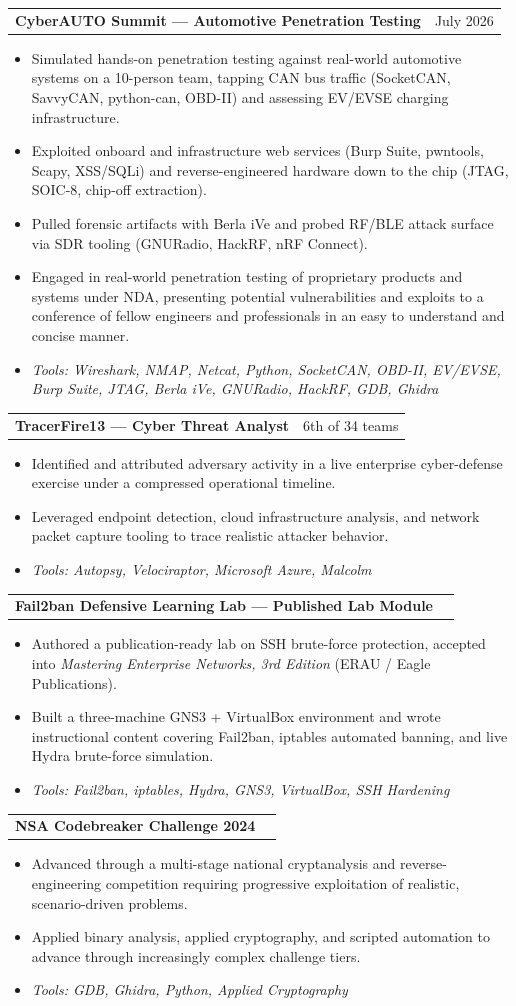 \documentclass[letterpaper,11pt]{article}
\makeatletter
\newcommand{\resumeItem}[1]{
  \item\small{
    {#1 \vspace{-2pt}}
  }
}
\newcommand{\resumeProjectHeading}[2]{
    \item
    \begin{tabular*}{0.97\textwidth}{l@{\extracolsep{\fill}}r}
      \small#1 & #2 \\
    \end{tabular*}\vspace{-7pt}
}
\newcommand{\resumeItemListStart}{\begin{itemize}}
\newcommand{\resumeItemListEnd}{\end{itemize}\vspace{-5pt}}
\makeatother
\begin{document}
      \resumeProjectHeading
          {\textbf{CyberAUTO Summit --- Automotive Penetration Testing}}{July 2026}
          \resumeItemListStart
            \resumeItem{Simulated hands-on penetration testing against real-world automotive systems on a 10-person team, tapping CAN bus traffic (SocketCAN, SavvyCAN, python-can, OBD-II) and assessing EV/EVSE charging infrastructure.}
            \resumeItem{Exploited onboard and infrastructure web services (Burp Suite, pwntools, Scapy, XSS/SQLi) and reverse-engineered hardware down to the chip (JTAG, SOIC-8, chip-off extraction).}
            \resumeItem{Pulled forensic artifacts with Berla iVe and probed RF/BLE attack surface via SDR tooling (GNURadio, HackRF, nRF Connect).}
            \resumeItem{Engaged in real-world penetration testing of proprietary products and systems under NDA, presenting potential vulnerabilities and exploits to a conference of fellow engineers and professionals in an easy to understand and concise manner.}
            \resumeItem{\textit{\small Tools: Wireshark, NMAP, Netcat, Python, SocketCAN, OBD-II, EV/EVSE, Burp Suite, JTAG, Berla iVe, GNURadio, HackRF, GDB, Ghidra}}
          \resumeItemListEnd

      \resumeProjectHeading
          {\textbf{TracerFire13 --- Cyber Threat Analyst}}{6th of 34 teams}
          \resumeItemListStart
            \resumeItem{Identified and attributed adversary activity in a live enterprise cyber-defense exercise under a compressed operational timeline.}
            \resumeItem{Leveraged endpoint detection, cloud infrastructure analysis, and network packet capture tooling to trace realistic attacker behavior.}
            \resumeItem{\textit{\small Tools: Autopsy, Velociraptor, Microsoft Azure, Malcolm}}
          \resumeItemListEnd

      \resumeProjectHeading
          {\textbf{Fail2ban Defensive Learning Lab --- Published Lab Module}}{}
          \resumeItemListStart
            \resumeItem{Authored a publication-ready lab on SSH brute-force protection, accepted into \textit{Mastering Enterprise Networks, 3rd Edition} (ERAU / Eagle Publications).}
            \resumeItem{Built a three-machine GNS3 + VirtualBox environment and wrote instructional content covering Fail2ban, iptables automated banning, and live Hydra brute-force simulation.}
            \resumeItem{\textit{\small Tools: Fail2ban, iptables, Hydra, GNS3, VirtualBox, SSH Hardening}}
          \resumeItemListEnd

      \resumeProjectHeading
          {\textbf{NSA Codebreaker Challenge 2024}}{}
          \resumeItemListStart
            \resumeItem{Advanced through a multi-stage national cryptanalysis and reverse-engineering competition requiring progressive exploitation of realistic, scenario-driven problems.}
            \resumeItem{Applied binary analysis, applied cryptography, and scripted automation to advance through increasingly complex challenge tiers.}
            \resumeItem{\textit{\small Tools: GDB, Ghidra, Python, Applied Cryptography}}
          \resumeItemListEnd
\end{document}
